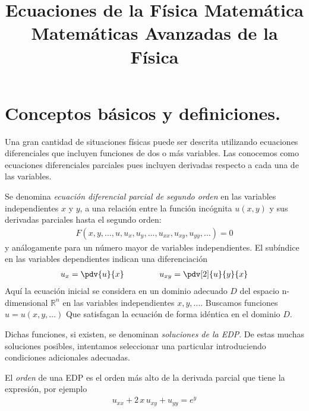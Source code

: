 
\author{}
\usepackage{tikz-3dplot}
\title{Ecuaciones de la Física Matemática \\ {\large Matemáticas Avanzadas de la Física}\vspace{-1.5\baselineskip}}
\date{}
\author{}

\maketitle
\fontsize{14}{14}\selectfont
\section{Conceptos básicos y definiciones.}
Una gran cantidad de situaciones físicas puede ser descrita utilizando ecuaciones diferenciales que incluyen funciones de dos o más variables. Las conocemos como ecuaciones diferenciales parciales pues incluyen derivadas respecto a cada una de las variables.
\par
Se denomina \emph{ecuación diferencial parcial de segundo orden} en las variables independientes $x$ y $y$, a una relación entre la función incógnita $u(x, y)$ y sus derivadas parciales hasta el segundo orden:
\begin{align*}
F (x, y, \ldots, u, u_{x}, u_{y}, \ldots, u_{xx}, u_{xy}, u_{yy}, \ldots) = 0
\end{align*}
y análogamente para un número mayor de variables independientes. El subíndice en las variables dependientes indican una diferenciación
\begin{align*}
u_{x} = \pdv{u}{x} \hspace{1.5cm} u_{x y} = \pdv[2]{u}{y}{x}
\end{align*}
Aquí la ecuación inicial se considera en un dominio adecuado $D$ del espacio n-dimensional $\mathbb{R}^{n}$ en las variables independientes $x, y, \ldots$. Buscamos funciones $u = u (x, y, \ldots)$ Que satisfagan la ecuación de forma idéntica en el dominio $D$.
\par
Dichas funciones, si existen, se denominan \emph{soluciones de la EDP}. De estas muchas soluciones posibles, intentamos seleccionar una particular introduciendo condiciones adicionales adecuadas.
\par
El \emph{orden} de una EDP es el orden más alto de la derivada parcial que tiene la expresión, por ejemplo
\begin{align*}
u_{x x} + 2 \, x \, u_{x y} + u_{y y} = e^{y}
\end{align*}
